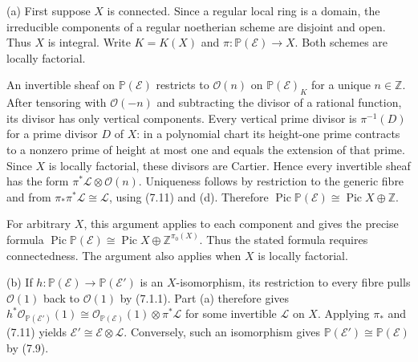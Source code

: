 (a) First suppose $X$ is connected. Since a regular local ring is a domain, the irreducible components of a regular noetherian scheme are disjoint and open. Thus $X$ is integral. Write $K=K(X)$ and $\pi:\mathbb P(\mathcal E)\to X$. Both schemes are locally factorial.

An invertible sheaf on $\mathbb P(\mathcal E)$ restricts to $\mathcal O(n)$ on $\mathbb P(\mathcal E)_K$ for a unique $n\in\mathbb Z$. After tensoring with $\mathcal O(-n)$ and subtracting the divisor of a rational function, its divisor has only vertical components. Every vertical prime divisor is $\pi^{-1}(D)$ for a prime divisor $D$ of $X$: in a polynomial chart its height-one prime contracts to a nonzero prime of height at most one and equals the extension of that prime. Since $X$ is locally factorial, these divisors are Cartier. Hence every invertible sheaf has the form $\pi^*\mathcal L\otimes\mathcal O(n)$. Uniqueness follows by restriction to the generic fibre and from $\pi_*\pi^*\mathcal L\cong\mathcal L$, using (7.11) and (d). Therefore $\operatorname{Pic}\mathbb P(\mathcal E)\cong\operatorname{Pic}X\oplus\mathbb Z$.

For arbitrary $X$, this argument applies to each component and gives the precise formula $\operatorname{Pic}\mathbb P(\mathcal E)\cong\operatorname{Pic}X\oplus\mathbb Z^{\pi_0(X)}$. Thus the stated formula requires connectedness. The argument also applies when $X$ is locally factorial.

(b) If $h:\mathbb P(\mathcal E)\to\mathbb P(\mathcal E')$ is an $X$-isomorphism, its restriction to every fibre pulls $\mathcal O(1)$ back to $\mathcal O(1)$ by (7.1.1). Part (a) therefore gives $h^*\mathcal O_{\mathbb P(\mathcal E')}(1)\cong\mathcal O_{\mathbb P(\mathcal E)}(1)\otimes\pi^*\mathcal L$ for some invertible $\mathcal L$ on $X$. Applying $\pi_*$ and (7.11) yields $\mathcal E'\cong\mathcal E\otimes\mathcal L$. Conversely, such an isomorphism gives $\mathbb P(\mathcal E')\cong\mathbb P(\mathcal E)$ by (7.9).
